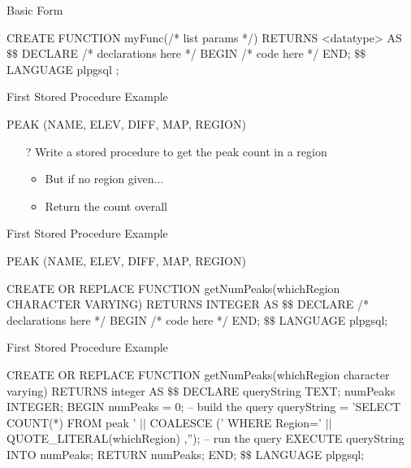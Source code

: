 \documentclass[aspectratio=169]{beamer}
\begin{document}
\begin{frame}[fragile]{Basic Form}

\begin{SQL}
CREATE FUNCTION myFunc(/* list params */)
   RETURNS <datatype> AS
$\textbf{\$\$}$
DECLARE
/* declarations here */
BEGIN
/* code here */
END;
$\textbf{\$\$}$
LANGUAGE plpgsql ;
\end{SQL}

\end{frame}


\begin{frame}[fragile]{First Stored Procedure Example}

\begin{SQL}
PEAK (NAME, ELEV, DIFF, MAP, REGION)
\end{SQL}

\begin{itemize}
\item[?] Write a stored procedure to get the peak count in a region
	\begin{itemize}
	\item But if no region given...
	\item Return the count overall
	\end{itemize}
\end{itemize}
\end{frame}
 

\begin{frame}[fragile]{First Stored Procedure Example}

\begin{SQL}
PEAK (NAME, ELEV, DIFF, MAP, REGION)

CREATE OR REPLACE FUNCTION getNumPeaks(whichRegion CHARACTER VARYING)
  RETURNS INTEGER AS
$\textbf{\$\$}$
DECLARE
	/* declarations here */
BEGIN
	/* code here */
END;
$\textbf{\$\$}$
LANGUAGE plpgsql;\end{SQL}
\end{frame}


\begin{frame}[fragile]{First Stored Procedure Example}

\begin{SQL}
CREATE OR REPLACE FUNCTION 
   getNumPeaks(whichRegion character varying)
   RETURNS integer AS
$\textbf{\$\$}$
DECLARE
  queryString TEXT;
  numPeaks INTEGER;
BEGIN
  numPeaks = 0;
  -- build the query
  queryString = 'SELECT COUNT(*) FROM peak ' $||$ 
      COALESCE (' WHERE Region=' $||$ 
         QUOTE_LITERAL(whichRegion) ,'');
  -- run the query
  EXECUTE queryString INTO numPeaks;
  RETURN numPeaks;
END;
$\textbf{\$\$}$
LANGUAGE plpgsql;
\end{SQL}
\end{frame}
\end{document}

